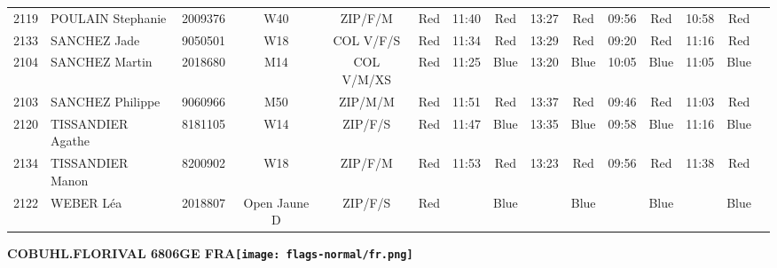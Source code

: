 \documentclass{report}
\begin{document}
\begin{longtable}{|c|l|r|c|c|*{5}{cc|}}
    2119 & POULAIN Stephanie & 2009376 & W40 & ZIP/F/M & Red & 11:40 & Red & 13:27 & Red & 09:56 & Red & 10:58 & Red &  \\
    2133 & SANCHEZ Jade & 9050501 & W18 & COL V/F/S & Red & 11:34 & Red & 13:29 & Red & 09:20 & Red & 11:16 & Red &  \\
    2104 & SANCHEZ Martin & 2018680 & M14 & COL V/M/XS & Red & 11:25 & Blue & 13:20 & Blue & 10:05 & Blue & 11:05 & Blue &  \\
    2103 & SANCHEZ Philippe & 9060966 & M50 & ZIP/M/M & Red & 11:51 & Red & 13:37 & Red & 09:46 & Red & 11:03 & Red &  \\
    2120 & TISSANDIER Agathe & 8181105 & W14 & ZIP/F/S & Red & 11:47 & Blue & 13:35 & Blue & 09:58 & Blue & 11:16 & Blue &  \\
    2134 & TISSANDIER Manon & 8200902 & W18 & ZIP/F/M & Red & 11:53 & Red & 13:23 & Red & 09:56 & Red & 11:38 & Red &  \\
    2122 & WEBER Léa & 2018807 & Open Jaune D & ZIP/F/S & Red &   & Blue &   & Blue &   & Blue &   & Blue &  \\
  \end{longtable}
\newpage
  \Huge \centering \bfseries COBUHL.FLORIVAL 6806GE FRA\normalfont \footnotesize \sffamily \hfill \texttt{[image: flags-normal/fr.png]} \newline 
\end{document}
